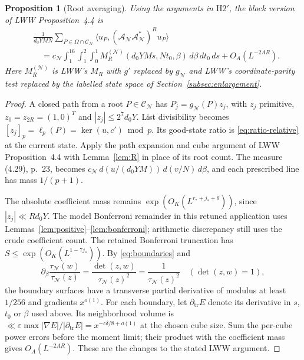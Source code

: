 \documentclass[11pt]{article}
\newtheorem{proposition}[theorem]{Proposition}
\theoremstyle{definition}
\newcommand{\GN}{\mathcal N}
\newcommand{\CC}{\mathcal C}
\newcommand{\tauN}{\tau_{\GN}}
\newcommand{\gN}{g_{\GN}}
\newcommand{\LWW}[1]{\cite[#1]{LWW}}
\theoremstyle{remark}
\numberwithin{equation}{section}
\begin{document}
\begin{proposition}[Root averaging]\label{prop:root-average}
Using the arguments in $\mathrm H2'$, the block version of
LWW Proposition~4.4 \LWW{pp.~22--24} is
\begin{equation}\label{eq:root-average}
 \begin{split}
 &\frac1{d_0YMN}\sum_{P\in\Omega\cap\CC_{\GN}}
       \langle u_P,(\mathcal A_{\GN}\mathcal A_{\GN}^*)^Ru_P\rangle\\
 &\quad=c_{\GN}\int_1^{16}\int_1^2\int_0^1
 M_R^{(\GN)}(d_0YMs,Nt_0,\beta)\,d\beta\,dt_0\,ds
       +O_A(L^{-2AR}).
 \end{split}
\end{equation}
Here $M_R^{(\GN)}$ is LWW's $M_R$ with $g'$ replaced by $\gN$
and LWW's coordinate-parity test replaced by the labelled state
space of Section~\ref{subsec:enlargement}.
\end{proposition}
\begin{proof}
A closed path from a root $P\in\CC_{\GN}$ has
$P_j=\gN(P)z_j$, with $z_j$ primitive,
$z_0=z_{2R}=(1,0)^T$ and $|z_j|\le2^7d_0Y$.
List divisibility becomes
$[z_j]_p=\ell_p(P)=\ker(u,c')\bmod p$.
Its good-state ratio is \eqref{eq:ratio-relative} at the current
state. Apply the path expansion and cube argument of LWW
Proposition~4.4 with Lemma~\ref{lem:R} in place of its root count.
The measure (4.29), p.~23, becomes
$c_{\GN}\,d(u/(d_0YM))\,d(v/N)\,d\beta$, and each prescribed line
has mass $1/(p+1)$.

The absolute coefficient mass remains $\exp(O_K(L^{r_*+j_*+\theta}))$,
since $|z_j|\ll Rd_0Y$.
The model Bonferroni remainder in this retuned application uses
Lemmas~\ref{lem:positive}--\ref{lem:bonferroni}; arithmetic
discrepancy still uses the crude coefficient count. The retained
Bonferroni truncation has
$S\le\exp(O_K(L^{1-7j_*}))$.
By \eqref{eq:boundaries} and
\begin{equation}\label{eq:ratio-derivative}
 \partial_\beta\frac{\tauN(w)}{\tauN(z)}
     =\frac{\det(z,w)}{\tauN(z)^2}
     =\frac1{\tauN(z)^2}\quad(\det(z,w)=1),
\end{equation}
the boundary surfaces have a transverse partial derivative of modulus
at least $1/256$ and gradients $x^{o(1)}$. For each boundary, let
$\partial_{\mathrm{tr}}E$ denote its derivative in $s$, $t_0$ or
$\beta$ used above. Its neighborhood volume is
$\ll\varepsilon\max|\nabla E|/|\partial_{\mathrm{tr}}E|
=x^{-c\delta/8+o(1)}$ at the chosen cube size.
Sum the per-cube power errors before the moment limit; their
product with the coefficient mass gives $O_A(L^{-2AR})$.
These are the changes to the stated LWW argument.
\end{proof}
\end{document}
